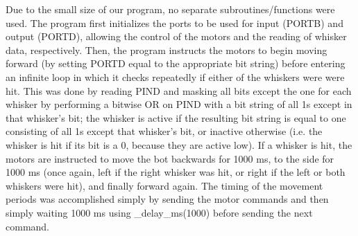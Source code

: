 \documentclass[12pt,letterpaper]{article}
\begin{document}
Due to the small size of our program, no separate subroutines/functions were
used.  The program first initializes the ports to be used for input (PORTB) and
output (PORTD), allowing the control of the motors and the reading of whisker
data, respectively.  Then, the program instructs the motors to begin moving
forward (by setting PORTD equal to the appropriate bit string) before entering
an infinite loop in which it checks repeatedly if either of the whiskers were
were hit.  This was done by reading PIND and masking all bits except the one
for each whisker by performing a bitwise OR on PIND with a bit string of all 1s
except in that whisker's bit; the whisker is active if the resulting bit string
is equal to one consisting of all 1s except that whisker's bit, or inactive
otherwise (i.e. the whisker is hit if its bit is a 0, because they are active
low).  If a whisker is hit, the motors are instructed to move the bot backwards
for 1000 ms, to the side for 1000 ms (once again, left if the right whisker was
hit, or right if the left or both whiskers were hit), and finally forward
again.  The timing of the movement periods was accomplished simply by sending
the motor commands and then simply waiting 1000 ms using \_delay\_ms(1000)
before sending the next command.
\end{document}
